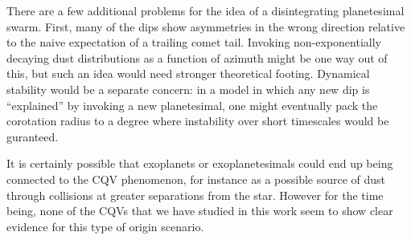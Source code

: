 \documentclass[11pt,twocolumn,tighten]{aastex63}
\begin{document}
There are a few additional problems for the idea of a disintegrating
planetesimal swarm.  First, many of the dips show asymmetries in
the wrong direction relative to the naive expectation of a
trailing comet tail.  Invoking non-exponentially decaying dust
distributions as a function of azimuth might be one way out of this,
but such an idea would need stronger theoretical footing.  
Dynamical stability would be a separate concern:
in a model in which any new dip is ``explained'' by invoking a new
planetesimal, one might eventually pack the corotation radius to a
degree where instability over short timescales would be guranteed.

It is certainly possible that exoplanets or exoplanetesimals could end
up being connected to the CQV phenomenon, for instance as a possible
source of dust through collisions at greater separations from the
star.  However for the time being, none of the CQVs that we have
studied in this work seem to show clear evidence for this type of
origin scenario.





\end{document}
